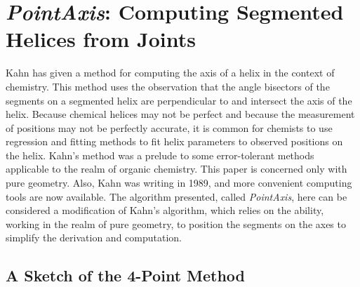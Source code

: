 \documentclass{svproc}
\begin{document}




\section{{\em PointAxis}: Computing Segmented Helices from Joints}
\label{sec:pointaxis}

Kahn\cite{kahn1989defining} has given a method for computing
the axis of a helix in the context of chemistry.
This method uses the observation that the angle bisectors
of the segments on a segmented helix are perpendicular to
and intersect the axis of the helix.
Because chemical helices may not be perfect and because the measurement of positions may not be perfectly accurate,
it is common for chemists to use regression and fitting methods to fit helix parameters to observed positions
on the helix.
Kahn's method was a prelude to some error-tolerant methods applicable to
the realm of organic chemistry\cite{enkhbayar2008helfit}.
This paper is concerned only with pure geometry. Also, Kahn was writing in 1989,
and more convenient computing tools are now available.
The algorithm presented, called {\em PointAxis}, here can be considered a modification of Kahn's algorithm,
which relies on the ability, working in the realm of pure geometry, to position the segments on the axes
to simplify the derivation and computation.

\subsection{A Sketch of the 4-Point Method}
\end{document}

